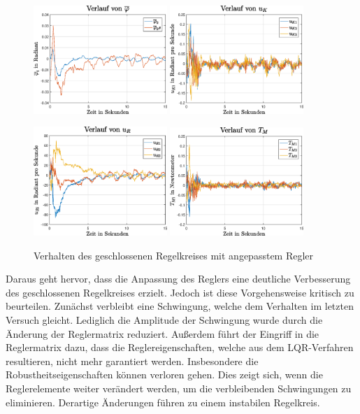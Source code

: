 \begin{figure}[h!]
\centering
\includegraphics[width=0.45\textwidth]{img/exp2_phi.eps}\hspace{0.7cm}
\includegraphics[width=0.45\textwidth]{img/exp2_uk.eps}
\vspace{0.5cm}

\includegraphics[width=0.45\textwidth]{img/exp2_ur.eps}\hspace{0.7cm}
\includegraphics[width=0.45\textwidth]{img/exp2_tm.eps}
\caption{Verhalten des geschlossenen Regelkreises mit angepasstem Regler}
\end{figure}
Daraus geht hervor, dass die Anpassung des Reglers eine deutliche Verbesserung des geschlossenen Regelkreises erzielt. Jedoch ist diese Vorgehensweise kritisch zu beurteilen. Zunächst verbleibt eine Schwingung, welche dem Verhalten im letzten Versuch gleicht. Lediglich die Amplitude der Schwingung wurde durch die Änderung der Reglermatrix reduziert. Außerdem führt der Eingriff in die Reglermatrix dazu, dass die Reglereigenschaften, welche aus dem LQR-Verfahren resultieren, nicht mehr garantiert werden. Insbesondere die Robustheitseigenschaften können verloren gehen. Dies zeigt sich, wenn die Reglerelemente weiter verändert werden, um die verbleibenden Schwingungen zu eliminieren. Derartige Änderungen führen zu einem instabilen Regelkreis.
